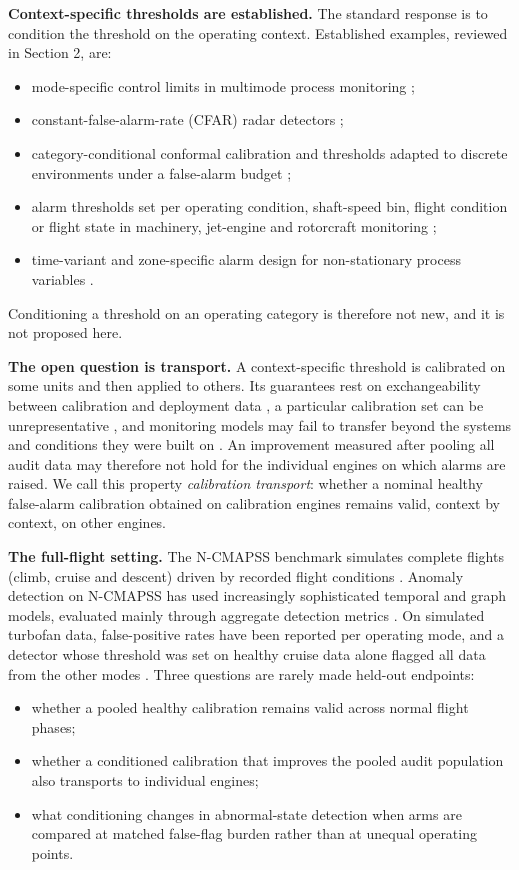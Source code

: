 \documentclass[preprint,11pt,a4paper]{elsarticle}
\begin{document}
\textbf{Context-specific thresholds are established.} The standard response is to condition the threshold on the operating context. Established examples, reviewed in Section 2, are:
\begin{itemize}
\item mode-specific control limits in multimode process monitoring \cite{N8};
\item constant-false-alarm-rate (CFAR) radar detectors \cite{N10};
\item category-conditional conformal calibration \cite{N7} and thresholds adapted to discrete environments under a false-alarm budget \cite{N45};
\item alarm thresholds set per operating condition, shaft-speed bin, flight condition or flight state in machinery, jet-engine and rotorcraft monitoring \cite{N22,N25,N26,N27};
\item time-variant and zone-specific alarm design for non-stationary process variables \cite{N39,N40}.
\end{itemize}

Conditioning a threshold on an operating category is therefore not new, and it is not proposed here.

\textbf{The open question is transport.} A context-specific threshold is calibrated on some units and then applied to others. Its guarantees rest on exchangeability between calibration and deployment data \cite{N20}, a particular calibration set can be unrepresentative \cite{N16}, and monitoring models may fail to transfer beyond the systems and conditions they were built on \cite{N21}. An improvement measured after pooling all audit data may therefore not hold for the individual engines on which alarms are raised. We call this property \emph{calibration transport}: whether a nominal healthy false-alarm calibration obtained on calibration engines remains valid, context by context, on other engines.

\textbf{The full-flight setting.} The N-CMAPSS benchmark simulates complete flights (climb, cruise and descent) driven by recorded flight conditions \cite{ref1}. Anomaly detection on N-CMAPSS has used increasingly sophisticated temporal and graph models, evaluated mainly through aggregate detection metrics \cite{ref7,ref8,ref9}. On simulated turbofan data, false-positive rates have been reported per operating mode, and a detector whose threshold was set on healthy cruise data alone flagged all data from the other modes \cite{N23}. Three questions are rarely made held-out endpoints:
\begin{itemize}
\item whether a pooled healthy calibration remains valid across normal flight phases;
\item whether a conditioned calibration that improves the pooled audit population also transports to individual engines;
\item what conditioning changes in abnormal-state detection when arms are compared at matched false-flag burden rather than at unequal operating points.
\end{itemize}
\end{document}
